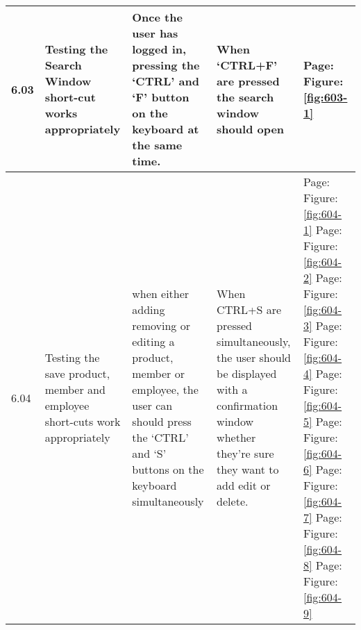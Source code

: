 \begin{flushleft}
\begin{longtable}{|p{1cm}|p{2.5cm}|p{2.5cm}|p{2cm}|p{2cm}|}
	\rowcolor{light-grey} 6.03 & Testing the Search Window short-cut works appropriately &Once the user has logged in, pressing the `CTRL'  and `F' button on the keyboard  at the same time. & When `CTRL+F' are pressed the search window should open&  Page:\pageref{fig:603-1}  \newline Figure:\ref{fig:603-1} \\ \hline
	\rowcolor{light-grey} 6.04 & Testing the save product, member and employee short-cuts work appropriately & when either adding removing or editing a product, member or employee, the user can should press the `CTRL' and `S' buttons on the keyboard simultaneously & When CTRL+S are pressed simultaneously, the user should be displayed with a confirmation window whether they're sure they want to add edit or delete.&  Page:\pageref{fig:604-1}  \newline Figure:\ref{fig:604-1} \newline \newline   Page:  \pageref{fig:604-2}  \newline Figure:\ref{fig:604-2} \newline \newline Page:\pageref{fig:604-3}  \newline Figure:\ref{fig:604-3} \newline \newline Page:\pageref{fig:604-4}  \newline Figure:\ref{fig:604-4}  \newline \newline   Page:\pageref{fig:604-5}  \newline Figure:\ref{fig:604-5} \newline \newline   Page:  \pageref{fig:604-6}  \newline Figure:\ref{fig:604-6} \newline \newline Page:\pageref{fig:604-7}  \newline Figure:\ref{fig:604-7} \newline \newline Page:\pageref{fig:604-8}  \newline Figure:\ref{fig:604-8} \newline \newline   Page:  \pageref{fig:604-9}  \newline Figure:\ref{fig:604-9} \\ \hline

\end{longtable}
\end{flushleft}
